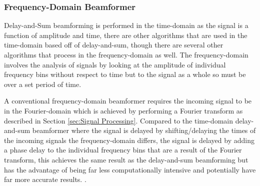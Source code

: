\documentclass{UoNMCHA}
\numberwithin{equation}{section}
\begin{document}
\subsubsection{Frequency-Domain Beamformer} \label{sec:Freq-Domain Beamformer}
    Delay-and-Sum beamforming is performed in the time-domain as the signal is a function of amplitude and time, there are other algorithms that are used in the time-domain based off of delay-and-sum, though there are several other algorithms that process in the frequency-domain as well. The frequency-domain involves the analysis of signals by looking at the amplitude of individual frequency bins without respect to time but to the signal as a whole so must be over a set period of time. 
    
    A conventional frequency-domain beamformer requires the incoming signal to be in the Fourier-domain which is achieved by performing a Fourier transform as described in Section \ref{sec:Signal Processing}. Compared to the time-domain delay-and-sum beamformer where the signal is delayed by shifting/delaying the times of the incoming signals the frequency-domain differs, the signal is delayed by adding a phase delay to the individual frequency bins that are a result of the Fourier transform, this achieves the same result as the delay-and-sum beamforming but has the advantage of being far less computationally intensive and potentially have far more accurate results. \citep{Kri13}.
\end{document}

